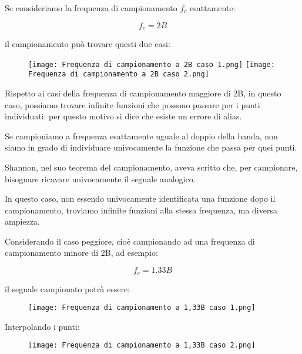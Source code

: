 Se consideriamo la frequenza di campionamento $f_c$ esattamente: 

{
    \Large 
    \begin{equation}
        f_c = 2B
    \end{equation}
}

il campionamento può trovare questi due casi: 

\begin{figure}[h]
    \centering
    \texttt{[image: Frequenza di campionamento a 2B caso 1.png]}
    \texttt{[image: Frequenza di campionamento a 2B caso 2.png]}
\end{figure}

\newpage 

Rispetto ai casi della frequenza di campionamento maggiore di 2B, 
in questo caso, possiamo trovare infinite funzioni che possono passare per i punti individuati: 
per questo motivo si dice che esiste un errore di alias. \newline 

Se campioniamo a frequenza esattamente uguale al doppio della banda, 
non siamo in grado di individuare univocamente la funzione che passa per quei punti. \newline 

Shannon, nel suo teorema del campionamento, aveva scritto che, per campionare, bisognare ricavare univocamente il segnale analogico. \newline 

In questo caso, non essendo univocamente identificata una funzione dopo il campionamento,  
troviamo infinite funzioni alla stessa frequenza, ma diversa ampiezza. \newline 

Considerando il caso peggiore, cioè campionando ad una frequenza di campionamento minore di 2B, ad esempio: 

{
    \Large 
    \begin{equation}
        f_c = 1.33B
    \end{equation}
}

il segnale campionato potrà essere:

\begin{figure}[h]
    \centering
    \texttt{[image: Frequenza di campionamento a 1,33B caso 1.png]}
\end{figure}

Interpolando i punti: 

\begin{figure}[h]
    \centering
   \texttt{[image: Frequenza di campionamento a 1,33B caso 2.png]}
\end{figure}



